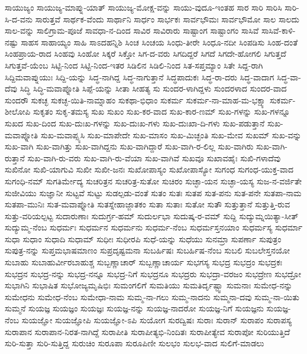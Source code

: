 {ಸಾಯುಜ್ಯಂ
ಸಾಯುಜ್ಯ-ಮಾಪ್ನು-ಯಾತ್
ಸಾಯುಜ್ಯ-ಮೋಕ್ಷ-ವನ್ನು
ಸಾಯು-ವುದೂ-ಇಂತಹ
ಸಾರ
ಸಾರಿ
ಸಾರಿಸಿ
ಸಾರಿ-ಸಿ-ದ-ವನು
ಸಾರುತ್ತವೆ
ಸಾರ್ಥಕ-ವೆಂದು
ಸಾರ್ಥಾನಿ
ಸಾರ್ಧಂ
ಸಾರ್ಭಕಃ
ಸಾರ್ವಭೌಮಃ
ಸಾರ್ವಭೌಮೋ
ಸಾಲ
ಸಾಲದು
ಸಾಲ-ವನ್ನು
ಸಾಲಿಗ್ರಾಮ-ಪೂಜೆ
ಸಾವಧಾ-ನ-ದಿಂದ
ಸಾವಿರ
ಸಾವಿರಾರು
ಸಾಷ್ಟಾಂಗ
ಸಾಷ್ಟಾಂಗಂ
ಸಾಸಿವೆ
ಸಾಸಿವೆ-ಕಾಳಿ-ನಷ್ಟು
ಸಾಹಸ
ಸಾಹಾಯ್ಯಂ
ಸಾಹಿ
ಸಾಽದಹನ್ನಿಶಿ
ಸಿಂಚ
ಸಿಂಚಯ
ಸಿಂಧು-ತೀರೇ
ಸಿಂಧೂ-ನದೀ
ಸಿಂಪಡಿಸು
ಸಿಂಹ-ದಂತೆ
ಸಿಂಹಪ್ರಾಯ-ರಾದ
ಸಿಂಹವು
ಸಿಂಹೋ
ಸಿಕ್ಕರೆ
ಸಿಕ್ತೋ
ಸಿಗ-ದ-ವರು
ಸಿಗದಿದ್ದರೆ
ಸಿಗದೆ
ಸಿಗದೇ-ಹೋಗಲಿ
ಸಿಗುತ್ತದೆ
ಸಿಗುತ್ತವೆ-ಯೆಂಬ
ಸಿಟ್ಟಿ-ನಿಂದ
ಸಿಟ್ಟಿ-ನಿಂದ-ಇತರ
ಸಿಡಿಲಿನ
ಸಿಡಿಲಿ-ನಿಂದ
ಸಿತ-ಸಪ್ತಮ್ಯಾಂ
ಸಿತೇ
ಸಿದ್ದ-ರಾಗಿ
ಸಿದ್ದಿಮವಾಪ್ನುಯುಃ
ಸಿದ್ದಿ-ಯನ್ನು
ಸಿದ್ಧ-ನಾಗಿದ್ದ
ಸಿದ್ಧ-ನಾಗುತ್ತಾನೆ
ಸಿದ್ಧಪಾದುಕಃ
ಸಿದ್ಧ-ರಾ-ದರು
ಸಿದ್ಧ-ವಾದಾಗ
ಸಿದ್ಧ-ವಾ-ದೆವು
ಸಿದ್ಧಿ
ಸಿದ್ಧಿ-ಮವಾಪ್ನೋತಿ
ಸಿಪ್ಪೆ-ಯನ್ನು
ಸೀತಾ
ಸೀಹತ್ಯ
ಸು
ಸುಂದರ-ಳಾಗಿದ್ದಳು
ಸುಂದರಳಾದ
ಸುಂದರ-ವಾದ
ಸುಂದರೌ
ಸುಕಚ್ಛ
ಸುಕಚ್ಛ-ಯಿತಿ-ನಾಮ್ನಾಹಂ
ಸುಕಥಾ-ಭಿಧಾಂ
ಸುಕರ್ಮ
ಸುಕರ್ಮ-ನಾ-ಮಾಹ-ಮ-ಭಕ್ಷ್ಯಾ
ಸುಕರ್ಮ-ಶೀಲೋಪಿ
ಸುಕೃತಂ
ಸುಕೃ-ತಮಸ್ಯ
ಸುಖ
ಸುಖಂ
ಸುಖ-ಕರ-ವಾದ
ಸುಖ-ಕಾರ-ಣಮ್
ಸುಖ-ಗಳನ್ನು
ಸುಖ-ಗಳನ್ನೂ
ಸುಖದ
ಸುಖ-ದಿಂದ
ಸುಖ-ದುಃಖ-ಗಳನ್ನು
ಸುಖ-ದುಃಖ-ಗಳು
ಸುಖ-ದುಃಖಾ-ದಿ-ಗಳು
ಸುಖ-ಪಡುತ್ತಾನೆ
ಸುಖ-ಮವಾಪ್ನೋತಿ
ಸುಖ-ಮವಾಪ್ಸ್ಯಸಿ
ಸುಖ-ಮಾಪೇದೇ
ಸುಖ-ಮಾಸಂ
ಸುಖ-ಮಿಚ್ಛಂತಿ
ಸುಖ-ಮೇವ
ಸುಖಮ್
ಸುಖ-ವನ್ನು
ಸುಖ-ವಾಗಿ
ಸುಖ-ವಾಗಿತ್ತು
ಸುಖ-ವಾಗಿದ್ದನು
ಸುಖ-ವಾಗಿದ್ದಾರೆ
ಸುಖ-ವಾಗಿ-ರ-ಲಿಲ್ಲ
ಸುಖ-ವಾಗಿರು
ಸುಖ-ವಾಗಿ-ರುತ್ತಾನೆ
ಸುಖ-ವಾಗಿ-ರು-ವರು
ಸುಖ-ವಾಗಿ-ರು-ವೆಯಾ
ಸುಖ-ವಾಗಿವೆ
ಸುಖವೂ
ಸುಖಾವಹೈಃ
ಸುಖಿ-ಗಳಾದೆವು
ಸುಖಿನೋ
ಸುಖಿ-ಯಾಗುವಿ
ಸುಖೀ
ಸುಖೀ-ಜನಃ
ಸುಖೋಪಾಸ್ಯಂ
ಸುಖೋಪಾಸ್ಯೋ
ಸುಗಂಧ
ಸುಗಂಧ-ಯುಕ್ತ-ವಾದ
ಸುಗಂಧಿ-ನಮ್
ಸುಗತಿರ್ಮೇದ್ಯ
ಸುಚರಿತ್ರನ
ಸುಚರಿತ್ರ-ಸುತೋ
ಸುಚಿರಂ
ಸುಚ್ಛಾ-ಯನ
ಸುಚ್ಛಾ-ಯಸ್ಯ
ಸುಜ-ನ-ವರ್ಜಿತೇ
ಸುಜೀವಿಯು
ಸುಜ್ಞಾನೀ
ಸುಟ್ಟವೆ
ಸುಟ್ಟು
ಸುಡಲ್ಪಡು-ವಂತೆ
ಸುತಂ
ಸುತಃ
ಸುತಪ
ಸುತ-ಪನು
ಸುತ-ಪನೇ
ಸುತಪಾ-ನಾಮ
ಸುತಪಾ-ಮುನಿಃ
ಸುತ-ಮವಾಪ್ನೋತಿ
ಸುತಸ್ನೇಹಾಜ್ಜಾತಕಂ
ಸುತಾ
ಸುತಾಃ
ಸುತೋ
ಸುತೌ
ಸುತ್ತುತ್ತಾನೆ
ಸುತ್ತುತ್ತಿ-ರುವ
ಸುತ್ತು-ವರಿಯಲ್ಪಟ್ಟ
ಸುದಾರುಣಾಃ
ಸುದುರ್ಗ್ರ-ಹಮ್
ಸುದುರ್ಲಭಾ
ಸುದುಷ್ಕ-ರ-ವಮ್
ಸುದ್ದಿ
ಸುದ್ಯುಮ್ನಯಿತ್ಯಾ-ಸೀತ್
ಸುದ್ಯುಮ್ಮ-ನೆಂಬ
ಸುಧರ್ಮಃ
ಸುಧರ್ಮನ
ಸುಧರ್ಮನು
ಸುಧರ್ಮ-ನೆಂಬ
ಸುಧರ್ಮಸ್ತನಯಾಂ
ಸುಧರ್ಮಸ್ಯ
ಸುಧರ್ಮಾ
ಸುಧಾ
ಸುಧಾಂ
ಸುಧಾದಿ
ಸುಧಾಮ್
ಸುಧೀಃ
ಸುಧೀರಪಿ
ಸುಧೆ-ಯನ್ನು
ಸುಧೆಯು
ಸುನಮ್ರಾ
ಸುಪರ್ಣಾ
ಸುಪುತ್ರಂ
ಸುಪುತ್ರ-ನನ್ನು
ಸುಪ್ತಮಭಾಷಮಾಣಂ
ಸುಪ್ರದೃಷ್ಟಮನಾ
ಸುಬರ್ಹಿಷಃ
ಸುಬರ್ಹಿಷ-ನೆಂಬ
ಸುಬಲಿ
ಸುಬಲೇಸ್ತನಯೋ
ಸುಬಾಹು
ಸುಬಾಹುರ್ವೀರಬಾಹುಶ್ಚ
ಸುಬ್ಬಣ್ಣಾಚಾರ್
ಸುಬ್ಬಣ್ಣಾಚಾರ್ಯ
ಸುಭಗಸ್ಯ
ಸುಭದ್ರ
ಸುಭದ್ರಂ
ಸುಭದ್ರಕಃ
ಸುಭದ್ರನ
ಸುಭದ್ರ-ನನ್ನು
ಸುಭದ್ರ-ನನ್ನೂ
ಸುಭದ್ರ-ನಿಗೆ
ಸುಭದ್ರನೂ
ಸುಭದ್ರರು
ಸುಭದ್ರಾ-ವರಜಂ
ಸುಭದ್ರೇಣ
ಸುಭದ್ರೋ
ಸುಭಾಗಿನಿ
ಸುಭಾಷಿತ
ಸುಭೋಜ್ಯಮೃಷಿಭಿಃ
ಸುಮಂಗಲಿಗೆ
ಸುಮತಿಯು
ಸುಮತಿರ್ದೃಷ್ಟ್ವಾ
ಸುಮನಾಃ
ಸುಮೇಧ-ನನ್ನು
ಸುಮೇಧನು
ಸುಮೇಧ-ನೆಂಬ
ಸುಮೇಧಾ-ನಾಮ
ಸುಮ್ಮ-ನಾ-ಗಲು
ಸುಮ್ಮ-ನಾದನು
ಸುಮ್ಮನಾ-ದವು
ಸುಮ್ಮ-ನಾ-ಯಿತು
ಸುಮ್ಮನೆ
ಸುಯಜ್ಞ
ಸುಯಜ್ಞಂ
ಸುಯಜ್ಞಃ
ಸುಯಜ್ಞ-ನನ್ನು
ಸುಯಜ್ಞ-ನಾದರೋ
ಸುಯಜ್ಞ-ನಿಗೆ
ಸುಯಜ್ಞನು
ಸುಯಜ್ಞ-ನೆಂಬ
ಸುಯಜ್ಞೋ
ಸುಯಜ್ಞೋಪಿ
ಸುಯಜ್ಞೋ-ಽಪಿ
ಸುಯೋಗ
ಸುರದ್ವಿಷಃ
ಸುರಾಃ
ಸುರಾನ್
ಸುರಾಪಂ
ಸುರಾಪಸ್ಯ
ಸುರಾಪಾನ
ಸುರಾಪಾನ-ನಿರತ-ನಾಗಿದ್ದೆ
ಸುರಾಪೀತಿ
ಸುರಾಪೀತ್ಯಭಿ-ನಿಂದಿತಃ
ಸುರಾಪೀತ್ಯೇವ
ಸುರಾಪೋ
ಸುರಿಯುತ್ತಿದೆ
ಸುರಿ-ಸುತ್ತಾ
ಸುರಿ-ಸುತ್ತಿದ್ದ
ಸುರುಚಿಂ
ಸುರೂಪಾ
ಸುರೂಪಿಣೀ
ಸುಲಭಂ
ಸುಲಭ-ವಾದ
ಸುಲಿಗೆ-ಮಾಡಲು
}

